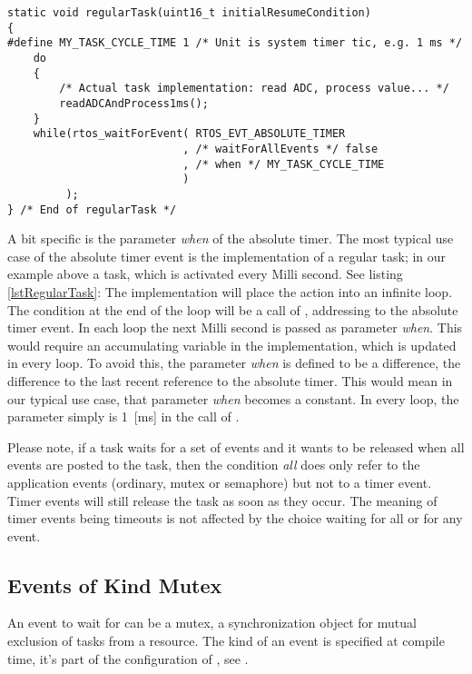 \begin{lstlisting}[float, caption=Typical use case: regular task,
label=lstRegularTask, captionpos=b]
static void regularTask(uint16_t initialResumeCondition)
{
#define MY_TASK_CYCLE_TIME 1 /* Unit is system timer tic, e.g. 1 ms */
    do
    {
        /* Actual task implementation: read ADC, process value... */
        readADCAndProcess1ms();
    }
    while(rtos_waitForEvent( RTOS_EVT_ABSOLUTE_TIMER
                           , /* waitForAllEvents */ false
                           , /* when */ MY_TASK_CYCLE_TIME
                           )
         );
} /* End of regularTask */
\end{lstlisting}

A bit specific is the parameter \emph{when} of the absolute timer. The
most typical use case of the absolute timer event is the implementation of
a regular task; in our example above a task, which is activated every
Milli second. See listing \ref{lstRegularTask}: The implementation will
place the action into an infinite loop. The  condition at the
end of the loop will be a call of , addressing
to the absolute timer event. In each loop the next Milli second is passed
as parameter \emph{when}. This would require an accumulating variable in
the implementation, which is updated in every loop. To avoid this, the
parameter \emph{when} is defined to be a difference, the difference to the
last recent reference to the absolute timer. This would mean in our typical
use case, that parameter \emph{when} becomes a constant. In every loop,
the parameter simply is 1~[ms] in the call of .

Please note, if a task waits for a set of events and it wants to be
released when all events are posted to the task, then the condition
\emph{all} does only refer to the application events (ordinary, mutex or
semaphore) but not to a timer event. Timer events will still release the
task as soon as they occur. The meaning of timer events being timeouts is
not affected by the choice waiting for all or for any event.


\subsection{Events of Kind Mutex}

An event to wait for can be a mutex, a synchronization object for mutual exclusion
of tasks from a resource. The kind of an event is specified at compile
time, it's part of the configuration of \rtos, see .

